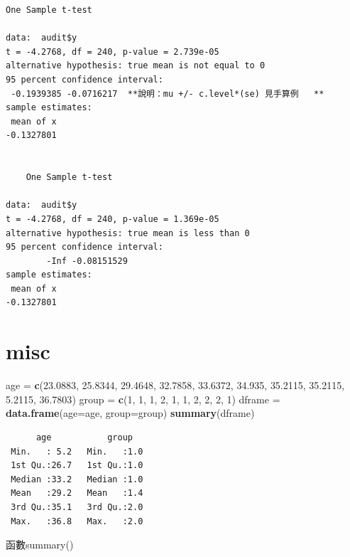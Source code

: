 \documentclass[]{book}
\newenvironment{Shaded}{\begin{snugshade}}{\end{snugshade}}
\newcommand{\DataTypeTok}[1]{\textcolor[rgb]{0.13,0.29,0.53}{#1}}
\newcommand{\DecValTok}[1]{\textcolor[rgb]{0.00,0.00,0.81}{#1}}
\newcommand{\FloatTok}[1]{\textcolor[rgb]{0.00,0.00,0.81}{#1}}
\newcommand{\KeywordTok}[1]{\textcolor[rgb]{0.13,0.29,0.53}{\textbf{#1}}}
\newcommand{\NormalTok}[1]{#1}
\newcommand{\StringTok}[1]{\textcolor[rgb]{0.31,0.60,0.02}{#1}}
\theoremstyle{definition}
\theoremstyle{definition}
\theoremstyle{definition}
\theoremstyle{remark}
\begin{document}
\begin{verbatim}
One Sample t-test

data:  audit$y
t = -4.2768, df = 240, p-value = 2.739e-05
alternative hypothesis: true mean is not equal to 0
95 percent confidence interval:
 -0.1939385 -0.0716217  **說明：mu +/- c.level*(se) 見手算例   **
sample estimates:
 mean of x 
-0.1327801 


    One Sample t-test

data:  audit$y
t = -4.2768, df = 240, p-value = 1.369e-05
alternative hypothesis: true mean is less than 0
95 percent confidence interval:
        -Inf -0.08151529
sample estimates:
 mean of x 
-0.1327801
\end{verbatim}

\hypertarget{misc-1}{%
\section{misc}\label{misc-1}}

\begin{Shaded}
\begin{Highlighting}[]
\NormalTok{age    =}\StringTok{ }\KeywordTok{c}\NormalTok{(}\FloatTok{23.0883}\NormalTok{, }\FloatTok{25.8344}\NormalTok{, }\FloatTok{29.4648}\NormalTok{, }\FloatTok{32.7858}\NormalTok{, }\FloatTok{33.6372}\NormalTok{,}
           \FloatTok{34.935}\NormalTok{,  }\FloatTok{35.2115}\NormalTok{, }\FloatTok{35.2115}\NormalTok{,  }\FloatTok{5.2115}\NormalTok{, }\FloatTok{36.7803}\NormalTok{)}
\NormalTok{group  =}\StringTok{ }\KeywordTok{c}\NormalTok{(}\DecValTok{1}\NormalTok{, }\DecValTok{1}\NormalTok{, }\DecValTok{1}\NormalTok{, }\DecValTok{2}\NormalTok{, }\DecValTok{1}\NormalTok{, }\DecValTok{1}\NormalTok{, }\DecValTok{2}\NormalTok{, }\DecValTok{2}\NormalTok{, }\DecValTok{2}\NormalTok{, }\DecValTok{1}\NormalTok{)}
\NormalTok{dframe =}\StringTok{ }\KeywordTok{data.frame}\NormalTok{(}\DataTypeTok{age=}\NormalTok{age, }\DataTypeTok{group=}\NormalTok{group)}
\KeywordTok{summary}\NormalTok{(dframe)}
\end{Highlighting}
\end{Shaded}

\begin{verbatim}
      age           group    
 Min.   : 5.2   Min.   :1.0  
 1st Qu.:26.7   1st Qu.:1.0  
 Median :33.2   Median :1.0  
 Mean   :29.2   Mean   :1.4  
 3rd Qu.:35.1   3rd Qu.:2.0  
 Max.   :36.8   Max.   :2.0  
\end{verbatim}

函數summary()
\end{document}
